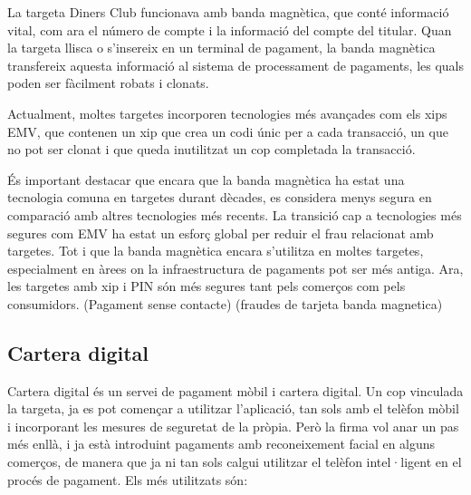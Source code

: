La targeta Diners Club funcionava amb banda magnètica, que conté informació vital, com ara el número de compte i la informació del compte del titular. Quan la targeta llisca o s'insereix en un terminal de pagament, la banda magnètica transfereix aquesta informació al sistema de processament de pagaments, les quals poden ser fàcilment robats i clonats. 

Actualment, moltes targetes incorporen tecnologies més avançades com els xips EMV, que contenen un xip que crea un codi únic per a cada transacció, un que no pot ser clonat i que queda inutilitzat un cop completada la transacció.

És important destacar que encara que la banda magnètica ha estat una tecnologia comuna en targetes durant dècades, es considera menys segura en comparació amb altres tecnologies més recents. La transició cap a tecnologies més segures com EMV ha estat un esforç global per reduir el frau relacionat amb targetes. Tot i que la banda magnètica encara s'utilitza en moltes targetes, especialment en àrees on la infraestructura de pagaments pot ser més antiga. Ara, les targetes amb xip i PIN són més segures tant pels comerços com pels consumidors.
(Pagament sense contacte)
(fraudes de tarjeta banda magnetica)



\subsection*{Cartera digital}

Cartera digital és un servei de pagament mòbil i cartera digital. Un cop vinculada la targeta, ja es pot començar a utilitzar l'aplicació, tan sols amb el telèfon mòbil i incorporant les mesures de seguretat de la pròpia. Però la firma vol anar un pas més enllà, i ja està introduint pagaments amb reconeixement facial en alguns comerços, de manera que ja ni tan sols calgui utilitzar el telèfon intel·ligent en el procés de pagament.
Els més utilitzats són:

